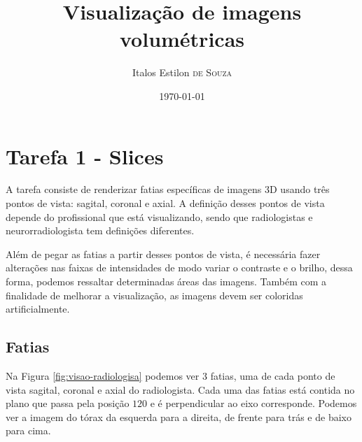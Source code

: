 \documentclass{article}
\title{Visualização de imagens volumétricas} %
\author{Italos Estilon \textsc{de Souza}} %
\date{\today} %
\begin{document}
\maketitle

\section{Tarefa 1 - Slices}

A tarefa consiste de renderizar fatias específicas de imagens 3D usando três pontos de vista: sagital, coronal e axial. A definição desses pontos de vista depende do profissional que está visualizando, sendo que radiologistas e neurorradiologista tem definições diferentes.
 
Além de pegar as fatias a partir desses pontos de vista, é necessária fazer alterações nas faixas de intensidades de modo variar o contraste e o brilho, dessa forma, podemos ressaltar determinadas áreas das imagens. Também com a finalidade de melhorar a visualização, as imagens devem ser coloridas artificialmente.

\subsection{Fatias}
Na Figura \ref{fig:visao-radiologisa} podemos ver 3 fatias, uma de cada ponto de vista sagital, coronal e axial do radiologista. Cada uma das fatias está contida no plano que passa pela posição $120$ e é perpendicular ao eixo corresponde. Podemos ver a imagem do tórax da esquerda para a direita, de frente para trás e de baixo para cima.
\end{document}
